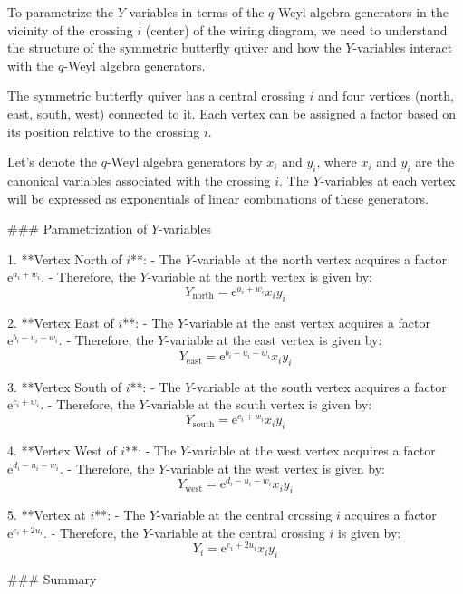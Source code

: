 To parametrize the \( Y \)-variables in terms of the \( q \)-Weyl algebra generators in the vicinity of the crossing \( i \) (center) of the wiring diagram, we need to understand the structure of the symmetric butterfly quiver and how the \( Y \)-variables interact with the \( q \)-Weyl algebra generators.

The symmetric butterfly quiver has a central crossing \( i \) and four vertices (north, east, south, west) connected to it. Each vertex can be assigned a factor based on its position relative to the crossing \( i \).

Let's denote the \( q \)-Weyl algebra generators by \( x_i \) and \( y_i \), where \( x_i \) and \( y_i \) are the canonical variables associated with the crossing \( i \). The \( Y \)-variables at each vertex will be expressed as exponentials of linear combinations of these generators.

### Parametrization of \( Y \)-variables

1. **Vertex North of \( i \)**:
   - The \( Y \)-variable at the north vertex acquires a factor \( \mathrm{e}^{a_i + w_i} \).
   - Therefore, the \( Y \)-variable at the north vertex is given by:
     \[
     Y_{\text{north}} = \mathrm{e}^{a_i + w_i} x_i y_i
     \]

2. **Vertex East of \( i \)**:
   - The \( Y \)-variable at the east vertex acquires a factor \( \mathrm{e}^{b_i - u_i - w_i} \).
   - Therefore, the \( Y \)-variable at the east vertex is given by:
     \[
     Y_{\text{east}} = \mathrm{e}^{b_i - u_i - w_i} x_i y_i
     \]

3. **Vertex South of \( i \)**:
   - The \( Y \)-variable at the south vertex acquires a factor \( \mathrm{e}^{c_i + w_i} \).
   - Therefore, the \( Y \)-variable at the south vertex is given by:
     \[
     Y_{\text{south}} = \mathrm{e}^{c_i + w_i} x_i y_i
     \]

4. **Vertex West of \( i \)**:
   - The \( Y \)-variable at the west vertex acquires a factor \( \mathrm{e}^{d_i - u_i - w_i} \).
   - Therefore, the \( Y \)-variable at the west vertex is given by:
     \[
     Y_{\text{west}} = \mathrm{e}^{d_i - u_i - w_i} x_i y_i
     \]

5. **Vertex at \( i \)**:
   - The \( Y \)-variable at the central crossing \( i \) acquires a factor \( \mathrm{e}^{e_i + 2u_i} \).
   - Therefore, the \( Y \)-variable at the central crossing \( i \) is given by:
     \[
     Y_i = \mathrm{e}^{e_i + 2u_i} x_i y_i
     \]

### Summary

